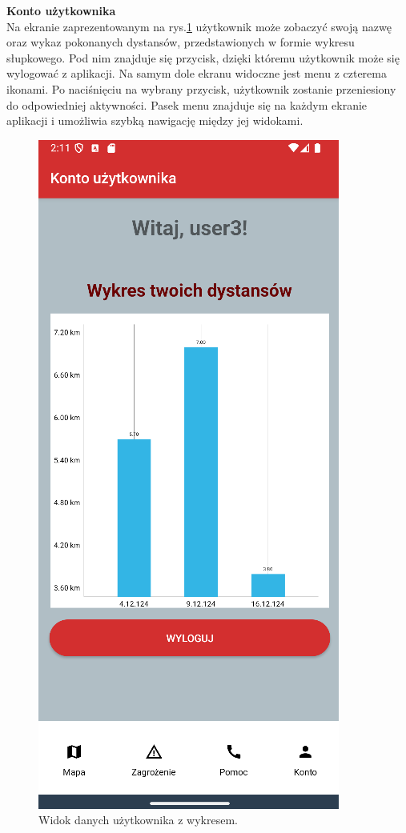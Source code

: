 \textbf{Konto użytkownika} \\
\indent Na ekranie zaprezentowanym na rys.\ref{widok:user} użytkownik może zobaczyć swoją nazwę oraz wykaz pokonanych dystansów, przedstawionych w formie wykresu słupkowego. Pod nim znajduje się przycisk, dzięki któremu użytkownik może się wylogować z aplikacji. Na samym dole ekranu widoczne jest menu z czterema ikonami. Po naciśnięciu na wybrany przycisk, użytkownik zostanie przeniesiony do odpowiedniej aktywności. Pasek menu znajduje się na każdym ekranie aplikacji i umożliwia szybką nawigację między jej widokami.\\
\begin{figure}[H]
    \centering
    \includegraphics[scale=0.5]{img/imp/widok-user.png}
    \caption{Widok danych użytkownika z wykresem.}
    \label{widok:user}
\end{figure}

